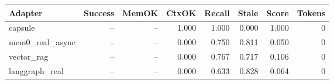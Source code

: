 \begin{tabular}{lrrrrrrr}
\hline
Adapter & Success & MemOK & CtxOK & Recall & Stale & Score & Tokens \\
\hline
capsule & -- & -- & 1.000 & 1.000 & 0.000 & 1.000 & 0 \\
mem0\_real\_async & -- & -- & 0.000 & 0.750 & 0.811 & 0.050 & 0 \\
vector\_rag & -- & -- & 0.000 & 0.767 & 0.717 & 0.106 & 0 \\
langgraph\_real & -- & -- & 0.000 & 0.633 & 0.828 & 0.064 & 0 \\
\hline
\end{tabular}
